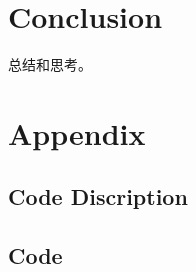 \documentclass{article}
\begin{document}
\section{Conclusion}

总结和思考。

\section{Appendix}
\subsection{Code Discription}

\subsection{Code}

\end{document}
